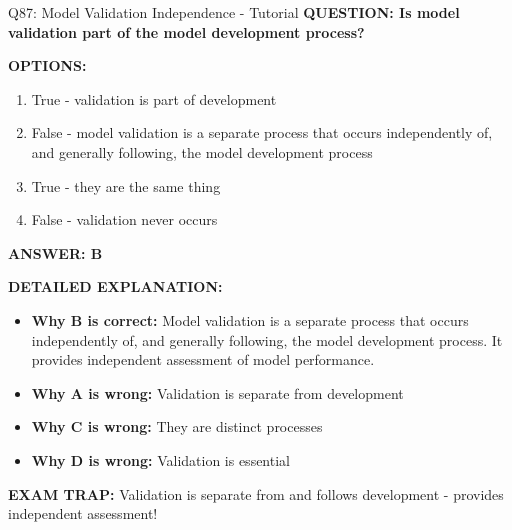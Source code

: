 \documentclass[8pt]{beamer}
\begin{document}
	\begin{frame}{Q87: Model Validation Independence - Tutorial}
		\fontsize{6.5}{7.5}\selectfont
		\textbf{QUESTION: Is model validation part of the model development process?}
		
		\vspace{0.1cm}
		\textbf{OPTIONS:}
		\begin{enumerate}
			\item True - validation is part of development
			\item False - model validation is a separate process that occurs independently of, and generally following, the model development process
			\item True - they are the same thing
			\item False - validation never occurs
		\end{enumerate}
		
		\vspace{0.1cm}
		\textcolor{myblue}{\textbf{ANSWER: B}}
		
		\vspace{0.1cm}
		\textbf{DETAILED EXPLANATION:}
		\begin{itemize}
			\item \textbf{Why B is correct:} Model validation is a separate process that occurs independently of, and generally following, the model development process. It provides independent assessment of model performance.
			\item \textbf{Why A is wrong:} Validation is separate from development
			\item \textbf{Why C is wrong:} They are distinct processes
			\item \textbf{Why D is wrong:} Validation is essential
		\end{itemize}
		
		\textcolor{myred}{\textbf{EXAM TRAP:}} Validation is \textcolor{myblue}{separate from and follows development} - provides independent assessment!
	\end{frame}
	
\end{document}
